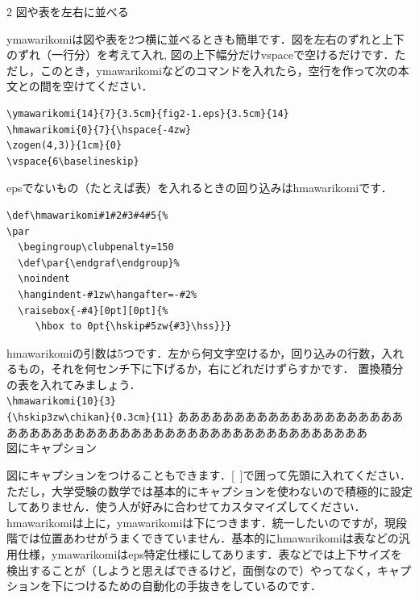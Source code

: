 \documentclass[fleqn,a4paper,8pt,papersize]{jsarticlek}
\begin{document}
\begin{multicols}{2}
\kakkosanb \quad 図や表を左右に並べる

\RESETKEYA
{}
ymawarikomiは図や表を2つ横に並べるときも簡単です．図を左右のずれと上下のずれ（一行分）を考えて入れ,
図の上下幅分だけvspaceで空けるだけです．ただし，このとき，ymawarikomiなどのコマンドを入れたら，空行を作って次の本文との間を空けてください．
\vspace{6\baselineskip}

\begin{Verbatim}
\ymawarikomi{14}{7}{3.5cm}{fig2-1.eps}{3.5cm}{14}
\hmawarikomi{0}{7}{\hspace{-4zw}
\zogen(4,3)}{1cm}{0}
\vspace{6\baselineskip}
\end{Verbatim}

epsでないもの（たとえば表）を入れるときの回り込みはhmawarikomiです．

\vspace{1\baselineskip}
\begin{Verbatim}
\def\hmawarikomi#1#2#3#4#5{%
\par
  \begingroup\clubpenalty=150
  \def\par{\endgraf\endgroup}%
  \noindent
  \hangindent-#1zw\hangafter=-#2%
  \raisebox{-#4}[0pt][0pt]{%
     \hbox to 0pt{\hskip#5zw{#3}\hss}}}
\end{Verbatim}

hmawarikomiの引数は5つです．左から何文字空けるか，回り込みの行数，入れるもの，それを何センチ下に下げるか，右にどれだけずらすかです．
置換積分の表を入れてみましょう．\\
\verb/\hmawarikomi{10}{3}/\\
\verb/{\hskip3zw\chikan}{0.3cm}{11}/
\RESETKEYD
{}%
ああああああああああああああああああああああああああああああああああああああああああああああああああああ\\

\kakkoshib \quad 図にキャプション

図にキャプションをつけることもできます．[\ ]で囲って先頭に入れてください．ただし，大学受験の数学では基本的にキャプションを使わないので積極的に設定してありません．使う人が好みに合わせてカスタマイズしてください．hmawarikomiは上に，ymawarikomiは下につきます．統一したいのですが，現段階では位置あわせがうまくできていません．基本的にhmawarikomiは表などの汎用仕様，ymawarikomiはeps特定仕様にしてあります．表などでは上下サイズを検出することが（しようと思えばできるけど，面倒なので）やってなく，キャプションを下につけるための自動化の手抜きをしているのです．


\end{multicols}
\end{document}
